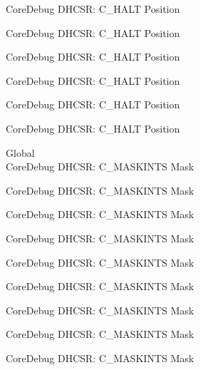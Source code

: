 \begin{DoxyRefList}
\label{deprecated__deprecated000859}%
%
Core\+Debug DHCSR\+: C\+\_\+\+HALT Position 

\label{deprecated__deprecated000942}%
%
Core\+Debug DHCSR\+: C\+\_\+\+HALT Position 

\label{deprecated__deprecated001001}%
%
Core\+Debug DHCSR\+: C\+\_\+\+HALT Position 

\label{deprecated__deprecated001077}%
%
Core\+Debug DHCSR\+: C\+\_\+\+HALT Position 

\label{deprecated__deprecated001166}%
%
Core\+Debug DHCSR\+: C\+\_\+\+HALT Position 

\label{deprecated__deprecated001268}%
%
Core\+Debug DHCSR\+: C\+\_\+\+HALT Position  
\item[Global \doxylink{group___c_m_s_i_s___core_debug_ga77fe1ef3c4a729c1c82fb62a94a51c31}{Core\+Debug\+\_\+\+DHCSR\+\_\+\+C\+\_\+\+MASKINTS\+\_\+\+Msk} ]\hfill \\
\label{deprecated__deprecated000034}%
%
Core\+Debug DHCSR\+: C\+\_\+\+MASKINTS Mask 

\label{deprecated__deprecated000122}%
%
Core\+Debug DHCSR\+: C\+\_\+\+MASKINTS Mask 

\label{deprecated__deprecated000178}%
%
Core\+Debug DHCSR\+: C\+\_\+\+MASKINTS Mask 

\label{deprecated__deprecated000261}%
%
Core\+Debug DHCSR\+: C\+\_\+\+MASKINTS Mask 

\label{deprecated__deprecated000320}%
%
Core\+Debug DHCSR\+: C\+\_\+\+MASKINTS Mask 

\label{deprecated__deprecated000396}%
%
Core\+Debug DHCSR\+: C\+\_\+\+MASKINTS Mask 

\label{deprecated__deprecated000485}%
%
Core\+Debug DHCSR\+: C\+\_\+\+MASKINTS Mask 

\label{deprecated__deprecated000587}%
%
Core\+Debug DHCSR\+: C\+\_\+\+MASKINTS Mask 

\label{deprecated__deprecated000712}%
%
Core\+Debug DHCSR\+: C\+\_\+\+MASKINTS Mask 


\end{DoxyRefList}

